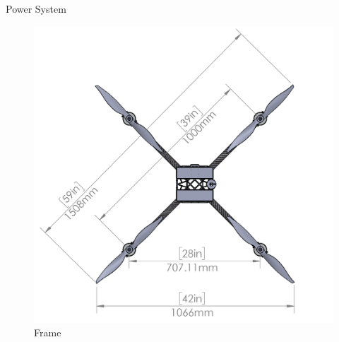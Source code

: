 \begin{subsubsection}{Power System}
\begin{figure}[ht]\centering
\includegraphics[width=\linewidth]{figures/Frame}
\caption{Frame}
\label{fig:frame}
\end{figure}


\end{subsubsection}

\endinput
